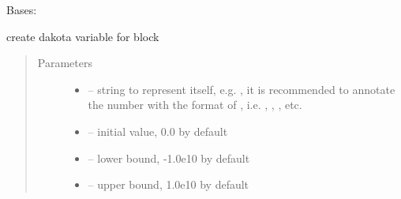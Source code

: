 \documentclass[letterpaper,10pt,english]{sphinxmanual}
\begin{document}

\begin{fulllineitems}
\label{\detokenize{src/apidocs/genopt:genopt.DakotaParam}}
Bases: \href{https://docs.python.org/2/library/functions.html\#object}{}

create dakota variable for  block
\begin{quote}\begin{description}
\item[{Parameters}] \leavevmode\begin{itemize}
\item {} 
 -- string to represent itself, e.g. ,
it is recommended to annotate the number with the format of ,
i.e. , , , etc.

\item {} 
 -- initial value, 0.0 by default

\item {} 
 -- lower bound, -1.0e10 by default

\item {} 
 -- upper bound, 1.0e10 by default

\end{itemize}

\end{description}\end{quote}

\begin{fulllineitems}
\label{\detokenize{src/apidocs/genopt:genopt.DakotaParam.initial}}
\end{fulllineitems}


\begin{fulllineitems}
\label{\detokenize{src/apidocs/genopt:genopt.DakotaParam.label}}
\end{fulllineitems}


\begin{fulllineitems}
\label{\detokenize{src/apidocs/genopt:genopt.DakotaParam.lower}}
\end{fulllineitems}


\begin{fulllineitems}
\label{\detokenize{src/apidocs/genopt:genopt.DakotaParam.upper}}
\end{fulllineitems}


\end{fulllineitems}
\end{document}
